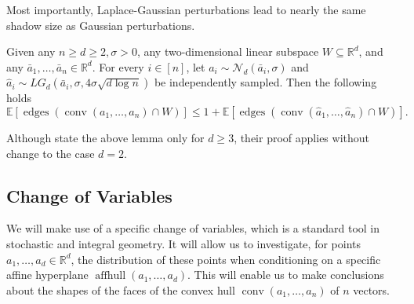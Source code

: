 \documentclass{theoretics}
\newcommand{\R}{\mathbb R}
\newcommand{\E}{\mathbb E}
\newcommand{\aff}{\operatorname{affhull}}
\newcommand{\conv}{\operatorname{conv}}
\newcommand{\edges}{\operatorname{edges}}
\renewcommand{\subset}{\subseteq}
\begin{document}
Most importantly, Laplace-Gaussian perturbations lead to nearly the same shadow size as Gaussian perturbations.
\begin{lemma}\label{lem:from-LG-to-Gaussian}
    Given any $n \geq d \geq 2, \sigma > 0$, any two-dimensional linear subspace $W \subset \R^d$, and any $\bar{a}_1,\ldots,\bar{a}_n \in \R^d$.
    For every $i \in [n]$, let $a_i \sim \mathcal{N}_d(\bar{a}_i, \sigma)$
    and $\widehat a_i \sim LG_d(\bar{a}_i, \sigma, 4\sigma \sqrt{d\log n})$ be independently sampled.
    Then the following holds
    \[
         \E\left[ \edges(\conv(a_1 , \ldots, a_n) \cap W) \right]
        \leq 1 + \E \left[ \edges(\conv(\widehat a_1 , \ldots, \widehat a_n) \cap W) \right].
    \]
\end{lemma}
Although \cite{DH18} state the above lemma only for $d \geq 3$, their proof applies without
change to the case $d = 2$.

\subsection{Change of Variables}\label{sec:change-of-variables}

We will make use of a specific change of variables, which is a standard tool in stochastic
and integral geometry.
It will allow us to investigate, for points $a_1,\dots,a_d \in \R^d$,
the distribution of these points when conditioning on a specific affine hyperplane
$\aff(a_1,\dots,a_d)$.
This will enable us to make conclusions about the shapes of the faces of
the convex hull $\conv(a_1,\dots,a_n)$ of $n$ vectors.
\end{document}
